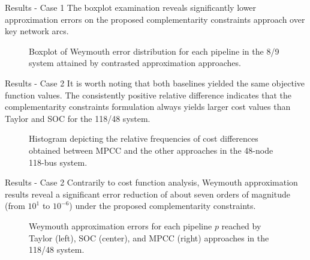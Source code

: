 \documentclass[hyperref={colorlinks,citecolor=blue,linkcolor=blue,urlcolor=blue}]{beamer}
\newlength\figureheight
\newlength\figurewidth
\begin{document}
\begin{frame}{Results - Case 1}
The boxplot examination reveals significantly lower approximation errors on the proposed complementarity constraints approach over key network arcs.

\begin{figure}[!htb]
    \centering
    \setlength{}        
    \setlength{}
    
    \caption{Boxplot of Weymouth error distribution for each pipeline in the 8/9 system attained by contrasted approximation approaches.}
    \label{fig:blue_test_boxplot}
\end{figure}
\end{frame}


\begin{frame}{Results - Case 2}
It is worth noting that both baselines yielded the same objective function values. The consistently positive relative difference indicates that the complementarity constraints formulation always yields larger cost values than Taylor and SOC for the 118/48 system.

\begin{figure}[!htb]
    \centering
    \setlength{}        
    \setlength{}
    
    \caption{Histogram depicting the relative frequencies of cost differences obtained between MPCC and the other approaches in the 48-node 118-bus system.}
    \label{fig:green_test_cost}
\end{figure}
\end{frame}


\begin{frame}{Results - Case 2}
Contrarily to cost function analysis, Weymouth approximation results reveal a significant error reduction of about seven orders of magnitude (from $10^1$ to $10^{-6}$) under the proposed complementarity constraints.
\begin{figure}[!htb]
\setlength{}        
\setlength{}
\subfloat[Taylor]{}
\subfloat[SOC]{}
\subfloat[MPCC]{}
\caption{Weymouth approximation errors for each pipeline $p$ reached by Taylor (left), SOC (center), and MPCC (right) approaches in the 118/48 system.}\label{fig:green_test_error}
\end{figure}
\end{frame}
\end{document}
